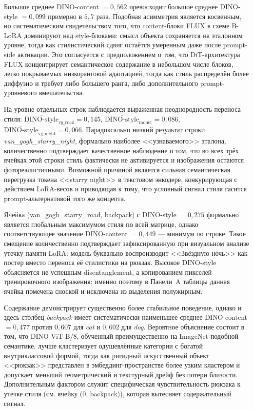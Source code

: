 \normalsize

Большое среднее DINO-content $= 0{,}562$ превосходит большое среднее DINO-style $= 0{,}099$ примерно в $5{,}7$ раза. Подобная асимметрия является косвенным, но систематическим свидетельством того, что content-блоки FLUX в схеме B-LoRA доминируют над style-блоками: смысл объекта сохраняется на эталонном уровне, тогда как стилистический сдвиг остаётся умеренным даже после prompt-side активации. Это согласуется с предположением о том, что DiT-архитектура FLUX концентрирует семантическое содержание в небольшом числе блоков, легко покрываемых низкоранговой адаптацией, тогда как стиль распределён более диффузно и требует либо большего ранга, либо дополнительного prompt-уровневого вмешательства.

На уровне отдельных строк наблюдается выраженная неоднородность переноса стиля: $\overline{\mathrm{DINO\text{-}style}}_{\mathrm{vg\_road}} = 0{,}145$, $\overline{\mathrm{DINO\text{-}style}}_{\mathrm{monet}} = 0{,}086$, $\overline{\mathrm{DINO\text{-}style}}_{\mathrm{vg\_night}} = 0{,}066$. Парадоксально низкий результат строки \textit{van\_gogh\_starry\_night}, формально наиболее <<узнаваемого>> эталона, количественно подтверждает качественное наблюдение о том, что во всех трёх ячейках этой строки стиль фактически не активируется и изображения остаются фотореалистичными. Возможной причиной является сильная семантическая перегрузка токена <<starry night>> в текстовом энкодере, конкурирующая с действием LoRA-весов и приводящая к тому, что условный сигнал стиля гасится prompt-альтернативой того же концепта.

Ячейка (van\_gogh\_starry\_road, backpack) с DINO-style $= 0{,}275$ формально является глобальным максимумом стиля по всей матрице, однако соответствующее значение DINO-content $= 0{,}449$ --- минимум по строке. Такое смещение количественно подтверждает зафиксированную при визуальном анализе утечку памяти LoRA: модель буквально воспроизводит <<Звёздную ночь>> как постер вместо переноса её стилистики на рюкзак. Высокое DINO-style объясняется не успешным disentanglement, а копированием пикселей тренировочного изображения; именно поэтому в Панели~A таблицы данная ячейка помечена сноской и исключена из выделения полужирным.

Содержание демонстрирует существенно более стабильное поведение, однако и здесь столбец \textit{backpack} имеет систематически наименьшее среднее DINO-content $= 0{,}477$ против $0{,}607$ для \textit{cat} и $0{,}602$ для \textit{dog}. Вероятное объяснение состоит в том, что DINO ViT-B/8, обученный преимущественно на ImageNet-подобной семантике, лучше кластеризует одушевлённые категории с богатой внутриклассовой формой, тогда как ригидный искусственный объект <<рюкзак>> представлен в эмбеддинг-пространстве более узким кластером и допускает меньший геометрический и текстурный дрейф без потери близости. Дополнительным фактором служит специфическая чувствительность рюкзака к утечке стиля (см. ячейку (0, backpack)), которая вытесняет содержательный сигнал.

